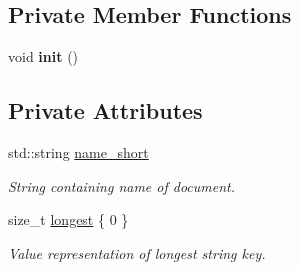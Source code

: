 \subsection*{Private Member Functions}
\begin{DoxyCompactItemize}
\item 
\mbox{\label{class_document_a67e7f9b8c668a723b6f7173ae52e5c99}} 
void {\bfseries init} ()
\end{DoxyCompactItemize}
\subsection*{Private Attributes}
\begin{DoxyCompactItemize}
\item 
\mbox{\label{class_document_ab15ddbb4889c3ed9be0eac73f9f1db94}} 
std\+::string \hyperlink{class_document_ab15ddbb4889c3ed9be0eac73f9f1db94}{name\+\_\+short}
\begin{DoxyCompactList}\small\item\em String containing name of document. \end{DoxyCompactList}\item 
\mbox{\label{class_document_ac0be9d01e5e7c2478f3857b0665789c7}} 
size\+\_\+t \hyperlink{class_document_ac0be9d01e5e7c2478f3857b0665789c7}{longest} \{ 0 \}
\begin{DoxyCompactList}\small\item\em Value representation of longest string key. \end{DoxyCompactList}\end{DoxyCompactItemize}
